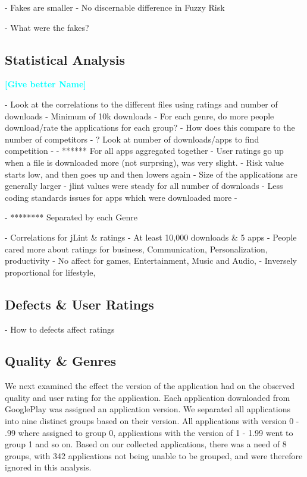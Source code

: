\documentclass{sig-alternate}
\newcommand{\todo}[1]{\textcolor{cyan}{\textbf{[#1]}}}
\begin{document}
- Fakes are smaller
- No discernable difference in Fuzzy Risk


- What were the fakes?



\subsection{Statistical Analysis} 
\todo{Give better Name}

- Look at the correlations to the different files using ratings and number of downloads
- Minimum of 10k downloads
- For each genre, do more people download/rate the applications for each group?
- How does this compare to the number of competitors
-	? Look at number of downloads/apps to find competition
- 
- ****** For all apps aggregated together
- User ratings go up when a file is downloaded more (not surprsing), was very slight.
- Risk value starts low, and then goes up and then lowers again
- Size of the applications are generally larger
- jlint values were steady for all number of downloads
- Less coding standards issues for apps which were downloaded more
- 

- ******** Separated by each Genre

- Correlations for jLint \& ratings
-		At least 10,000 downloads \& 5 apps
-	People cared more about ratings for business, Communication, Personalization, productivity
-	No affect for games, Entertainment,  Music and Audio, 
- 	Inversely proportional for lifestyle, 



\subsection{Defects \& User Ratings}
- How to defects affect ratings




\subsection{Quality \& Genres}


We next examined the effect the version of the application had on the observed quality and user rating for the application. Each application downloaded from GooglePlay was assigned an application version. We separated all applications into nine distinct groups based on their version. All applications with version 0 - .99 where assigned to group 0, applications with the version of 1 - 1.99 went to group 1 and so on. Based on our collected applications, there was a need of 8 groups, with 342 applications not being unable to be grouped, and were therefore ignored in this analysis. 
\end{document}
